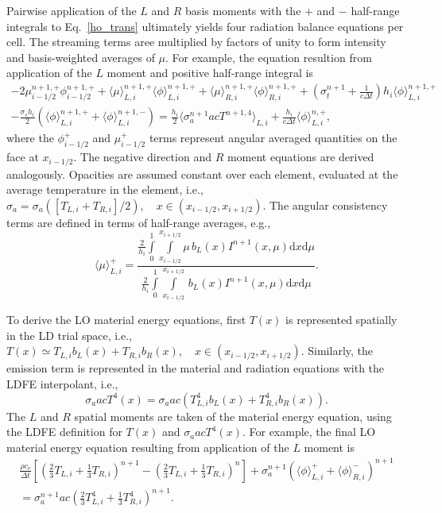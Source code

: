 \documentclass{mc2013}
\renewcommand{\d}{\mathrm{d}}
\newcommand{\mom}[1]{\langle #1 \rangle}
\newcommand{\xl}{{x_{i-1/2}}}
\newcommand{\xr}{{x_{i+1/2}}}
\newcommand{\il}{{i-1/2}}
\newcommand{\ir}{{i+1/2}}
\begin{document}
Pairwise application of the $L$ and $R$ basis
moments with the $+$ and $-$ half-range integrals to Eq.~\eqref{ho_trans} 
ultimately yields four radiation balance
equations per cell. The streaming terms aree multiplied by factors of unity to form
intensity and basis-weighted
averages of $\mu$.  For example, the equation resultion from application of the $L$ moment and
positive half-range integral is
\begin{multline}\label{lo_tran}
    -2{\mu}_{i-1/2}^{n+1,+} \phi_{i-1/2}^{n+1,+} + \mom {\mu}_{L,i}^{n+1,+}
  \mom{\phi}_{L,i}^{n+1,+}
  +  \mom\mu_{R,i}^{n+1,+}
  \mom{\phi}_{R,i}^{n+1,+} +  \left(\sigma_t^{n+1}+\frac{1}{c \Delta t} \right) h_i 
  \mom{\phi}_{L,i}^{n+1,+} \\-  \frac{\sigma_s h_i}{2} \left( \mom{\phi}_{L,i}^{n+1,+} +
  \mom\phi_{L,i}^{n+1,-}\right) = \frac{h_i}{2} \mom{\sigma_a^{n+1} a c T^{n+1,4}}_{L,i} +
  \frac{h_i}{c\Delta t}\mom{\phi}_{L,i}^{n,+},
\end{multline}
where the $\phi^+_{i-1/2}$ and $\mu^+_{i-1/2}$ terms represent angular averaged
quantities on the face at $x_{\il}$.  The negative direction and $R$ moment equations are
derived analogously. Opacities are assumed constant over each element, evaluated at the
average temperature in the element, i.e., $\sigma_a =
\sigma_a([T_{L,i}+T_{R,i}]/2),\quad x\in(x_\il, x_\ir)$. The angular consistency terms are defined in terms of half-range averages, e.g.,
\begin{equation}\label{const}
\mom{{\mu}}_{L,i}^+ =  \frac{
{\displaystyle \frac{2}{h_i}} \int\limits_0^1 \int\limits_\xl^\xr \mu \, b_L(x)
I^{n+1}(x,\mu) \d x \d \mu } 
{{\displaystyle \frac{2}{h_i}} \int\limits_0^1 \int\limits_\xl^\xr \, b_L(x)
I^{n+1}(x,\mu) \d x \d \mu } .
\end{equation}


To derive the LO material energy equations, first $T(x)$ is represented spatially in
the LD trial space, i.e.,
$ T(x) \simeq T_{L,i} b_L(x) + T_{R,i} b_R(x),\quad x\in(x_{i-1/2},x_\ir)$.
Similarly, the emission term is represented in the material and radiation equations with the LDFE
interpolant, i.e.,
\begin{equation}
\sigma_{a}acT^4(x) = \sigma_{a}ac\left(T_{L,i}^4 b_{L}(x) +
T_{R,i}^4 b_R(x)\right).
\end{equation}
 The $L$ and $R$ spatial moments are taken of the material energy equation, using the
 LDFE
 definition for $T(x)$ and $\sigma_a a c T^4(x)$. For example, the final LO material energy
 equation resulting from application of the $L$ moment is
 \begin{multline}\label{lo_mat_dis}
    \frac{\rho c_v}{\Delta t}\left[ \left(\frac{2}{3}T_{L,i} + \frac{1}{3}T_{R,i}
        \right)^{n+1} - \left(\frac{2}{3}T_{L,i} + \frac{1}{3}T_{R,i}
    \right)^{n} \right]  + \sigma_a^{n+1} \left( \mom{\phi}_{L,i}^+ +
    \mom{\phi}_{R,i}^- \right)^{n+1} \\ = \sigma_a^{n+1}a c
\left( \frac{2}{3} T_{L,i}^4 + \frac{1}{3}T_{R,i}^4
        \right)^{n+1}.
\end{multline}
\end{document}
